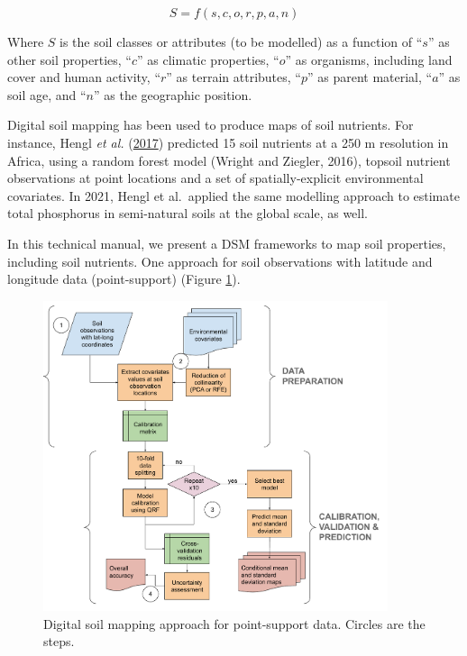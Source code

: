 \documentclass[
  10pt,
  b5paper,
  oneside]{book}
\begin{document}
\begin{equation} 
  S = f\left(s,c,o,r,p,a,n\right)
  \label{eq:scorpan}
\end{equation}

Where \(S\) is the soil classes or attributes (to be modelled) as a function of ``\(s\)'' as other soil properties, ``\(c\)'' as climatic properties, ``\(o\)'' as organisms, including land cover and human activity, ``\(r\)'' as terrain attributes, ``\(p\)'' as parent material, ``\(a\)'' as soil age, and ``\(n\)'' as the geographic position.

Digital soil mapping has been used to produce maps of soil nutrients. For instance, Hengl \emph{et al.} (\protect\hyperlink{ref-Hengl2017}{2017}) predicted 15 soil nutrients at a 250 m resolution in Africa, using a random forest model (Wright and Ziegler, 2016), topsoil nutrient observations at point locations and a set of spatially-explicit environmental covariates. In 2021, Hengl et al.~applied the same modelling approach to estimate total phosphorus in semi-natural soils at the global scale, as well.

In this technical manual, we present a DSM frameworks to map soil properties, including soil nutrients. One approach for soil observations with latitude and longitude data (point-support) (Figure \ref{fig:workflow1}).

\begin{figure}
  \centering
  \includegraphics[width=0.9\textwidth]{images/workflow lat-long data.pdf}
  \caption{Digital soil mapping approach for point-support data. Circles are the steps.}
  \label{fig:workflow1}
\end{figure}
\end{document}
